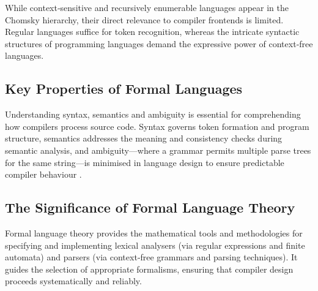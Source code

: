 While context‑sensitive and recursively enumerable languages appear in the Chomsky hierarchy, their direct relevance to compiler frontends is limited. Regular languages suffice for token recognition, whereas the intricate syntactic structures of programming languages demand the expressive power of context‑free languages.

\subsection{Key Properties of Formal Languages}

Understanding syntax, semantics and ambiguity is essential for comprehending how compilers process source code. Syntax governs token formation and program structure, semantics addresses the meaning and consistency checks during semantic analysis, and ambiguity—where a grammar permits multiple parse trees for the same string—is minimised in language design to ensure predictable compiler behaviour \cite{aho2007compilers}.

\subsection{The Significance of Formal Language Theory}

Formal language theory provides the mathematical tools and methodologies for specifying and implementing lexical analysers (via regular expressions and finite automata) and parsers (via context‑free grammars and parsing techniques). It guides the selection of appropriate formalisms, ensuring that compiler design proceeds systematically and reliably.

\pagebreak
